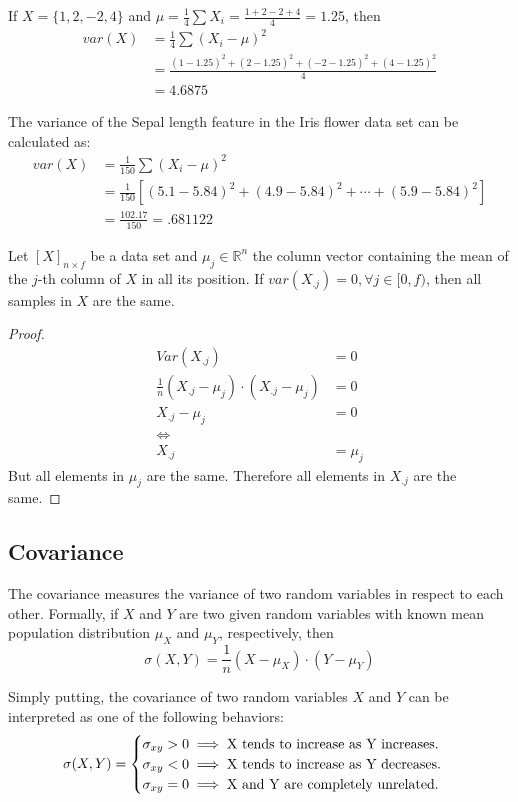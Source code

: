 \begin{example}
	If $X=\{1, 2, -2, 4\}$ and $\mu = \frac{1}{4} \sum X_i = \frac{1+2-2+4}{4} = 1.25$, then
	\begin{align*}
	var(X) &= \frac{1}{4} \sum (X_i - \mu)^2 \\
	&= \frac{(1-1.25)^2 + (2-1.25)^2 + (-2-1.25)^2 + (4-1.25)^2}{4} \\
	&= 4.6875
	\end{align*}
\end{example}

\begin{example}
	The variance of the Sepal length feature in the Iris flower data set can be calculated as:
	\begin{align*}
	var(X) &= \frac{1}{150} \sum (X_i - \mu)^2 \\
	&= \frac{1}{150} [(5.1-5.84)^2 + (4.9-5.84)^2 + \cdots + (5.9-5.84)^2] \\
	&= \frac{102.17}{150} = .681122
	\end{align*}
\end{example}

Let $[X]_{n \times f}$ be a data set and $\mu_j \in \mathbb{R}^n$ the column vector containing the mean of the $j$-th column of $X$ in all its position. If $var(X_{.j}) = 0, \forall j \in [0, f)$, then all samples in $X$ are the same.
\begin{proof}
	\begin{align*}
	Var(X_{.j}) &= 0 \\
	\frac{1}{n} (X_{.j} - \mu_j) \cdot (X_{.j} - \mu_j) &= 0 \\
	X_{.j} - \mu_j &= 0  \\
	\iff& \\
	X_{.j} &= \mu_j
	\end{align*}
	But all elements in $\mu_j$ are the same. Therefore all elements in $X_{.j}$ are the same.
\end{proof}

\subsection{Covariance}

The covariance measures the variance of two random variables in respect to each other. Formally, if $X$ and $Y$ are two given random variables with known mean population distribution $\mu_X$ and $\mu_Y$, respectively, then
$$\sigma(X, Y) = \frac{1}{n} (X - \mu_X) \cdot (Y - \mu_Y) $$

Simply putting, the covariance of two random variables $X$ and $Y$ can be interpreted as one of the following behaviors:
$$
\sigma(X,Y) = \begin{cases}
\sigma_{xy} > 0 \implies \textnormal{X tends to increase as Y increases.}\\
\sigma_{xy} < 0 \implies \textnormal{X tends to increase as Y decreases.}\\
\sigma_{xy} = 0 \implies \textnormal{X and Y are completely unrelated.}
\end{cases}
$$

